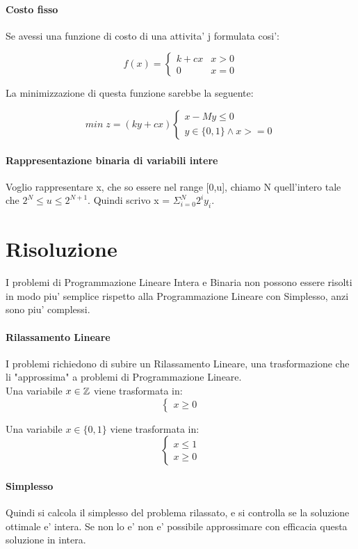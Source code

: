 \paragraph{Costo fisso}

Se avessi una funzione di costo di una attivita' j formulata cosi':

\[
    f(x) = 
    \begin{cases}
        k + cx & x > 0\\
        0 & x = 0
    \end{cases}
\]

La minimizzazione di questa funzione sarebbe la seguente:

\[
    min \; z = (ky + cx)
    \begin{cases}
        x - My \leq 0 \\
        y \in \{0,1\} \land x >= 0
    \end{cases}
\]

\paragraph{Rappresentazione binaria di variabili intere}

Voglio rappresentare x, che so essere nel range [0,u], chiamo N quell'intero tale che $2^N \leq u \leq 2^{N+1}$.
Quindi scrivo x = $\Sigma ^N _{i=0} 2^i y_i$.

\section{Risoluzione}

I problemi di Programmazione Lineare Intera e Binaria non possono essere risolti in modo piu' semplice rispetto alla Programmazione Lineare con Simplesso, anzi sono piu' complessi.

\paragraph{Rilassamento Lineare}

I problemi richiedono di subire un Rilassamento Lineare, una trasformazione che li "approssima" a problemi di Programmazione Lineare. \\

Una variabile $x \in \mathbb{Z}$ viene trasformata in:
\[
    \begin{cases}
    x \geq 0
    \end{cases}
\]

Una variabile $x \in \{0,1\}$ viene trasformata in:
\[
    \begin{cases}
        x \leq 1 \\
        x \geq 0
    \end{cases}
\]

\paragraph{Simplesso}

Quindi si calcola il simplesso del problema rilassato, e si controlla se la soluzione ottimale e' intera. Se non lo e' non e' possibile approssimare con efficacia questa soluzione in intera.
